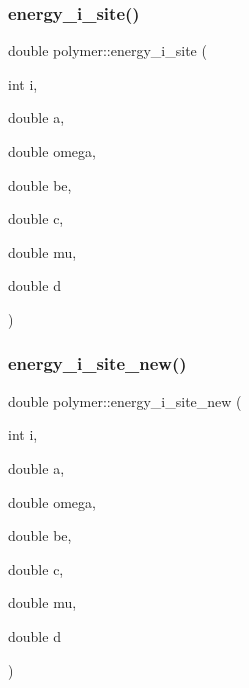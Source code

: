 \hypertarget{classpolymer_a3b56762501aa220610ca1eadb69ffe06}{}\label{classpolymer_a3b56762501aa220610ca1eadb69ffe06} 
\subsubsection{\texorpdfstring{energy\+\_\+i\+\_\+site()}{energy\_i\_site()}}
{\footnotesize\ttfamily double polymer\+::energy\+\_\+i\+\_\+site (\begin{DoxyParamCaption}\item[{int}]{i,  }\item[{double}]{a,  }\item[{double}]{omega,  }\item[{double}]{be,  }\item[{double}]{c,  }\item[{double}]{mu,  }\item[{double}]{d }\end{DoxyParamCaption})}

\hypertarget{classpolymer_a47c7d5b3032498f761d5ff4c6f6bd84a}{}\label{classpolymer_a47c7d5b3032498f761d5ff4c6f6bd84a} 
\subsubsection{\texorpdfstring{energy\+\_\+i\+\_\+site\+\_\+new()}{energy\_i\_site\_new()}}
{\footnotesize\ttfamily double polymer\+::energy\+\_\+i\+\_\+site\+\_\+new (\begin{DoxyParamCaption}\item[{int}]{i,  }\item[{double}]{a,  }\item[{double}]{omega,  }\item[{double}]{be,  }\item[{double}]{c,  }\item[{double}]{mu,  }\item[{double}]{d }\end{DoxyParamCaption})}

\hypertarget{classpolymer_a6ac7f37ee8e4dcdbbd08f8ecb9efee8b}{}\label{classpolymer_a6ac7f37ee8e4dcdbbd08f8ecb9efee8b} 
